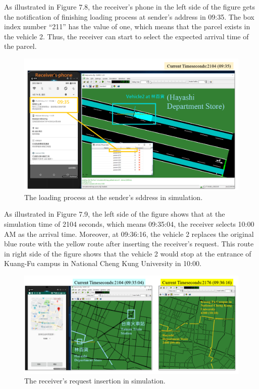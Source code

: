 \documentclass[12pt]{ksthesis}
\begin{document}
\begin{thesis}
{As illustrated in Figure 7.8, the receiver’s phone in the left side of the figure gets the notification of finishing loading process at sender’s address in 09:35. The box index number “211” has the value of one, which means that the parcel exists in the vehicle 2. Thus, the receiver can start to select the expected arrival time of the parcel.

\begin{figure}[H]
\centering
\includegraphics[width=1.12\textwidth]{./Thesis_figures/F7-8_loadingProcess.PNG}
\caption{\large The loading process at the sender’s sddress in simulation.}
\vspace{0.5cm}
\label{Fig:LoadingProcess}
\end{figure}


As illustrated in Figure 7.9, the left side of the figure shows that at the simulation time of 2104 seconds, which means 09:35:04, the receiver selects 10:00 AM as the arrival time. 
Moreover, at 09:36:16, the vehicle 2 replaces the original blue route with the yellow route after inserting the receiver’s request. This route in right side of the figure shows that the vehicle 2 would stop at the entrance of Kuang-Fu campus in National Cheng Kung University in 10:00.

\begin{figure}[H]
\centering
\includegraphics[width=1.12\textwidth]{./Thesis_figures/F7-9_receiverRequest.PNG}
\caption{\large The receiver’s request insertion in simulation.}
\vspace{0.5cm}


\end{figure}}
\end{thesis}
\end{document}
